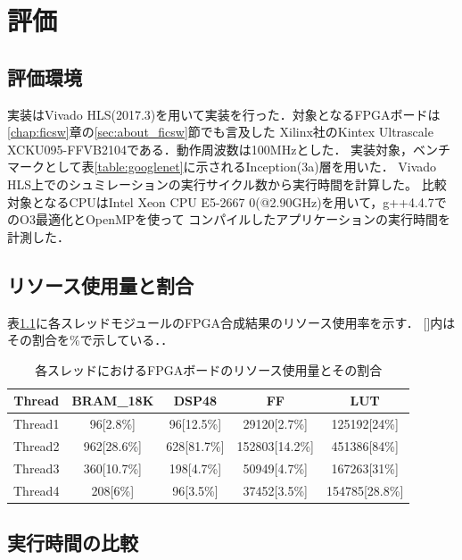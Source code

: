 \chapter{評価}
{
\label{chap:eval}

\section{評価環境}
\label{sec:eval_env}
実装はVivado HLS(2017.3)を用いて実装を行った．対象となるFPGAボードは\ref{chap:ficsw}章の\ref{sec:about_ficsw}節でも言及した
Xilinx社のKintex Ultrascale　XCKU095-FFVB2104である．動作周波数は100MHzとした．
実装対象，ベンチマークとして表\ref{table:googlenet}に示されるInception(3a)層を用いた．
Vivado HLS上でのシュミレーションの実行サイクル数から実行時間を計算した。
比較対象となるCPUはIntel Xeon CPU E5-2667 0(@2.90GHz)を用いて，g++4.4.7でのO3最適化とOpenMPを使って
コンパイルしたアプリケーションの実行時間を計測した．

\section{リソース使用量と割合}
\label{sec:resource_util}
表\ref{table:resource_util}に各スレッドモジュールのFPGA合成結果のリソース使用率を示す．
[]内はその割合を\%で示している．．

\begin{table}[p]
    \begin{center}
    \caption{各スレッドにおけるFPGAボードのリソース使用量とその割合}
    \label{table:resource_util}
    \begin{tabular}{|c|c|c|c|c|} \hline
    \multicolumn{1}{|c|}{Thread} & \multicolumn{1}{|c|}{BRAM\_18K} & \multicolumn{1}{|c|}{DSP48} & \multicolumn{1}{|c|}{FF} & \multicolumn{1}{|c|}{LUT} \\ \hline \hline
    Thread1       & 96[2.8\%] & 96[12.5\%] & 29120[2.7\%] & 125192[24\%] \\ \hline
    Thread2       & 962[28.6\%] & 628[81.7\%] & 152803[14.2\%] & 451386[84\%] \\ \hline
    Thread3       & 360[10.7\%] & 198[4.7\%] & 50949[4.7\%] & 167263[31\%] \\ \hline
    Thread4       & 208[6\%] & 96[3.5\%] & 37452[3.5\%] & 154785[28.8\%] \\ \hline
    \end{tabular}
    \end{center}
\end{table}


\section{実行時間の比較}
\label{sec:resource_util}

}
